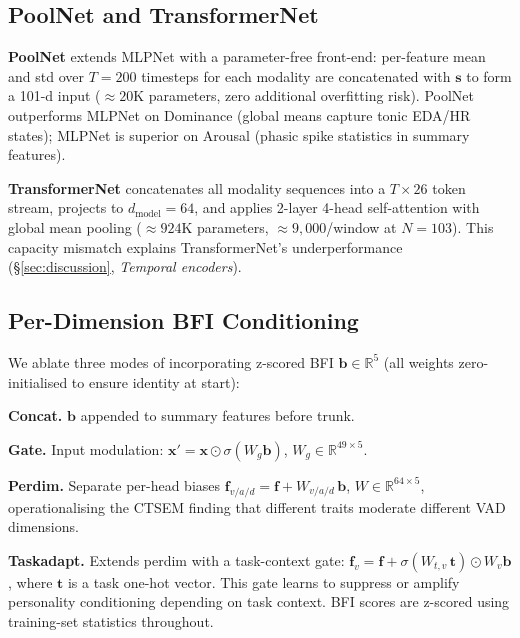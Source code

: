 \documentclass[sigconf,review,anonymous]{acmart}
\begin{document}
\subsection{PoolNet and TransformerNet}
\label{sec:poolnet}

\textbf{PoolNet} extends MLPNet with a parameter-free front-end:
per-feature mean and std over $T{=}200$ timesteps for each modality are
concatenated with $\mathbf{s}$ to form a 101-d input
($\approx20$K parameters, zero additional overfitting risk).
PoolNet outperforms MLPNet on Dominance (global means capture tonic EDA/HR
states); MLPNet is superior on Arousal (phasic spike statistics in summary
features).

\textbf{TransformerNet} concatenates all modality sequences into a
$T{\times}26$ token stream, projects to $d_\text{model}{=}64$, and applies
2-layer 4-head self-attention with global mean pooling ($\approx924$K
parameters, $\approx9{,}000$/window at $N{=}103$).
This capacity mismatch explains TransformerNet's underperformance
(§\ref{sec:discussion}, \textit{Temporal encoders}).

\subsection{Per-Dimension BFI Conditioning}
\label{sec:bfi}

We ablate three modes of incorporating z-scored BFI $\mathbf{b} \in
\mathbb{R}^5$ (all weights zero-initialised to ensure identity at start):

\textbf{Concat.} $\mathbf{b}$ appended to summary features before trunk.

\textbf{Gate.} Input modulation:
$\mathbf{x}' = \mathbf{x} \odot \sigma(W_g \mathbf{b})$,
$W_g \in \mathbb{R}^{49 \times 5}$.

\textbf{Perdim.} Separate per-head biases
$\mathbf{f}_{v/a/d} = \mathbf{f} + W_{v/a/d}\,\mathbf{b}$,
$W \in \mathbb{R}^{64 \times 5}$, operationalising the CTSEM finding
that different traits moderate different VAD dimensions.

\textbf{Taskadapt.} Extends perdim with a task-context gate:
$\mathbf{f}_{v} = \mathbf{f} + \sigma(W_{t,v}\,\mathbf{t}) \odot W_v \mathbf{b}$,
where $\mathbf{t}$ is a task one-hot vector.
This gate learns to suppress or amplify personality conditioning
depending on task context.
BFI scores are z-scored using training-set statistics throughout.
\end{document}
